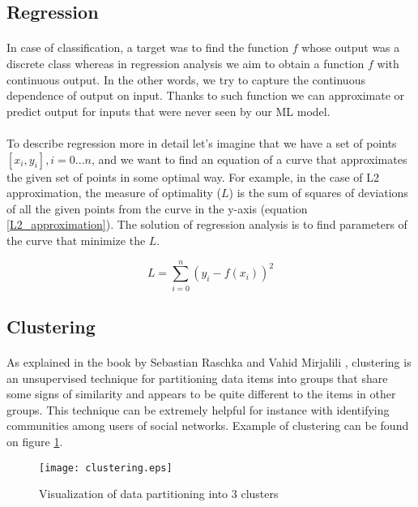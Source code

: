 \subsection{Regression}
\paragraph{}
In case of classification, a target was to find the function $f$ whose output was a discrete class whereas in regression analysis we aim to obtain a function $f$ with continuous output. In the other words, we try to capture the continuous dependence of output on input. Thanks to such function we can approximate or predict output for inputs that were never seen by our ML model. \cite{python_ml_2nd}

\paragraph{}
To describe  regression more in detail let's imagine that we have a set of points $[x_i, y_i], i=0 ... n$,  and we want to find an equation of a curve that approximates the given set of points in some optimal way. For example, in the case of L2 approximation, the measure of optimality ($L$) is the sum of squares of deviations of all the given points from the curve in the y-axis (equation \ref{L2_approximation}). The solution of regression analysis is to find parameters of the curve that minimize the $L$.

\begin{equation}
	L = \sum_{i=0}^{n} (y_i - f(x_i))^2
	\label{L2_approximation}
\end{equation} 

\subsection{Clustering}
\paragraph{}
As explained in the book by Sebastian Raschka and Vahid Mirjalili \cite{python_ml_2nd}, clustering is an unsupervised technique for partitioning data items into groups that share some signs of similarity and appears to be quite different to the items in other groups. This technique can be extremely helpful for instance with identifying communities among users of social networks. Example of clustering can be found on figure \ref{clustering_visualization}.

\begin{figure}[!h]
	\texttt{[image: clustering.eps]}
	\centering
	\caption{Visualization of data partitioning into 3 clusters}
	\label{clustering_visualization}
\end{figure}

